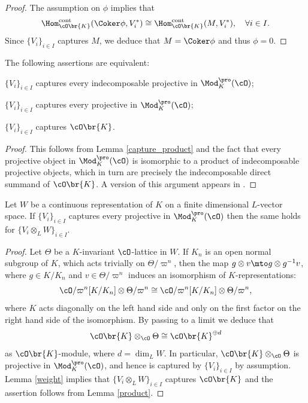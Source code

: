 \begin{proof} The assumption on $\phi$ implies that\vspace*{-3pt}\enlargethispage{.5\baselineskip}%
\[
\Hom_{\cO\br{K}}^{\rm cont}(\Coker \phi, V_i^*)\cong \Hom_{\cO\br{K}}^{\rm cont}(M, V_i^*), \quad \forall i\in I.
\]
Since $\{V_i\}_{i\in I}$ captures $M$, we
deduce that $M=\Coker \phi$ and thus $\phi=0$.
\end{proof}

\begin{lem}\label{product} The following assertions are equivalent:
\begin{enumeratei}
\item
$\{V_i\}_{i\in I}$ captures every indecomposable projective in $\Mod^{\pro}_{K}(\cO)$;
\item
$\{V_i\}_{i\in I}$ captures every projective in $\Mod^{\pro}_{K}(\cO)$;
\item
$\{V_i\}_{i\in I}$ captures $\cO\br{K}$.
\end{enumeratei}
\end{lem}

\begin{proof} This follows from Lemma \ref{capture_product} and the fact that every projective object in $\Mod^{\pro}_K(\cO)$ is isomorphic to a product of indecomposable projective objects, which in turn are precisely the indecomposable
direct summand of $\cO\br{K}$. A version of this argument appears in \cite[Lem.\,2.11]{CDP}.
\end{proof}

\begin{lem}\label{weight_proj} Let $W$ be a continuous representation of $K$ on a finite dimensional $L$-vector space. If $\{V_i\}_{i\in I}$ captures every projective in $\Mod^{\pro}_{K}(\cO)$
then the same holds for $\{V_i \otimes_L W\}_{i\in I}$.
\end{lem}

\begin{proof} Let $\Theta$ be a $K$-invariant $\cO$-lattice in $W$. If $K_n$ is an open normal subgroup of $K$, which acts trivially on $\Theta/\varpi^n$, then
the map $g \otimes v \mto g \otimes g^{-1} v$, where $g\in K/K_n$ and $v \in \Theta/\varpi^n$ induces an isomorphism of $K$-representations:
\[
\cO/\varpi^n [ K/K_n] \otimes \Theta/\varpi^n \cong \cO/\varpi^n [ K/K_n] \otimes \Theta/\varpi^n,
\]
where $K$ acts diagonally on the left hand side and only on the first factor on the right hand side of the isomorphism. By passing to a limit we deduce that
\[
\cO\br{K}\otimes_{\cO} \Theta\cong \cO\br{K}^{\oplus d}
\]
as $\cO\br{K}$-module, where $d=\dim_L W$.
In particular, $\cO\br{K}\otimes_{\cO} \Theta$ is projective in $\Mod^{\pro}_{K}(\cO)$, and hence is captured by $\{V_i\}_{i\in I}$ by assumption. Lemma \ref{weight} implies that
$\{V_i\otimes_L W\}_{i \in I}$ captures $\cO\br{K}$ and the assertion follows from Lemma \ref{product}.
\end{proof}

